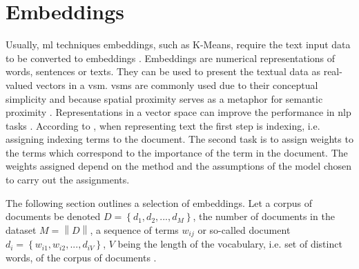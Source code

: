 \section{Embeddings}\label{sec:embeddings}

Usually, \ac{ml} techniques embeddings, such as K-Means, require the text input data to be converted to embeddings \cite{SentRep2014}.
Embeddings are numerical representations of words, sentences or texts.
They can be used to present the textual data as real-valued vectors in a \ac{vsm}.
\acp{vsm} are commonly used due to their conceptual simplicity and because spatial proximity serves as a metaphor for semantic proximity 
\cite{tfidf2008, UniversalSentEnc2018, HfsentTrans2019, Top2Vec2020}.
Representations in a vector space can improve the performance in \ac{nlp} tasks \cite{SkipGram2013}.
According to \citeauthor{tfidf2008}, when representing text the first step is indexing, i.e. assigning indexing terms to the document.
The second task is to assign weights to the terms which correspond to the importance of the term in the document.
The weights assigned depend on the method and the assumptions of the model chosen to carry out the assignments.

The following section outlines a selection of embeddings.
Let a corpus of documents be denoted $D= \left\{d_1, d_2, ..., d_M  \right\}$, the number of documents in the dataset $M = \left\| D \right\|$,
a sequence of terms $w_{ij}$ or so-called document $d_i = \left\{w_{i1}, w_{i2}, ..., d_{iV}  \right\}$, $V$ being the length of the vocabulary, 
i.e. set of distinct words, of the corpus of documents \cite{clusteringDocs2020}.










